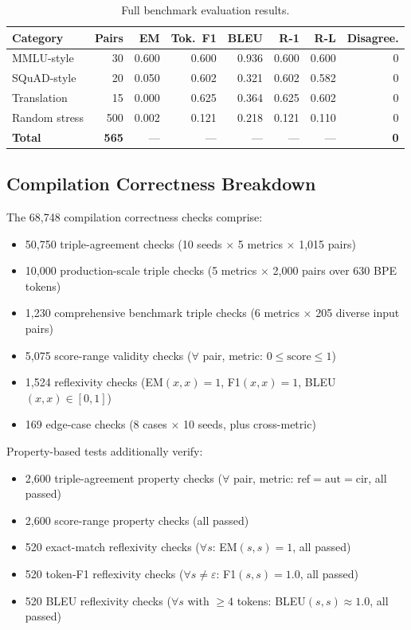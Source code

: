 \documentclass[11pt]{article}
\begin{document}
\begin{table}[h]
\centering
\caption{Full benchmark evaluation results.}\label{tab:full-benchmark}
\smallskip
\begin{tabular}{@{}lrrrrrrr@{}}
\toprule
\textbf{Category} & \textbf{Pairs} & \textbf{EM} & \textbf{Tok.\ F1} &
  \textbf{BLEU} & \textbf{R-1} & \textbf{R-L} & \textbf{Disagree.} \\
\midrule
MMLU-style     & 30  & 0.600 & 0.600 & 0.936 & 0.600 & 0.600 & 0 \\
SQuAD-style    & 20  & 0.050 & 0.602 & 0.321 & 0.602 & 0.582 & 0 \\
Translation    & 15  & 0.000 & 0.625 & 0.364 & 0.625 & 0.602 & 0 \\
Random stress  & 500 & 0.002 & 0.121 & 0.218 & 0.121 & 0.110 & 0 \\
\midrule
\textbf{Total} & \textbf{565} & --- & --- & --- & --- & --- & \textbf{0} \\
\bottomrule
\end{tabular}
\end{table}

\subsection{Compilation Correctness Breakdown}

The 68{,}748 compilation correctness checks comprise:
\begin{itemize}[nosep]
\item 50{,}750 triple-agreement checks
  (10 seeds $\times$ 5 metrics $\times$ 1{,}015 pairs)
\item 10{,}000 production-scale triple checks
  (5 metrics $\times$ 2{,}000 pairs over 630 BPE tokens)
\item 1{,}230 comprehensive benchmark triple checks
  (6 metrics $\times$ 205 diverse input pairs)
\item 5{,}075 score-range validity checks
  ($\forall$ pair, metric: $0 \leq \text{score} \leq 1$)
\item 1{,}524 reflexivity checks
  (EM$(x,x) = 1$, F1$(x,x) = 1$, BLEU$(x,x) \in [0,1]$)
\item 169 edge-case checks (8 cases $\times$ 10 seeds, plus cross-metric)
\end{itemize}

\noindent Property-based tests additionally verify:
\begin{itemize}[nosep]
\item 2{,}600 triple-agreement property checks
  ($\forall$ pair, metric: $\text{ref}=\text{aut}=\text{cir}$, all passed)
\item 2{,}600 score-range property checks (all passed)
\item 520 exact-match reflexivity checks ($\forall s$: EM$(s,s)=1$, all passed)
\item 520 token-F1 reflexivity checks ($\forall s \neq \varepsilon$: F1$(s,s)=1.0$, all passed)
\item 520 BLEU reflexivity checks ($\forall s$ with $\geq 4$ tokens: BLEU$(s,s) \approx 1.0$, all passed)
\end{itemize}
\end{document}
